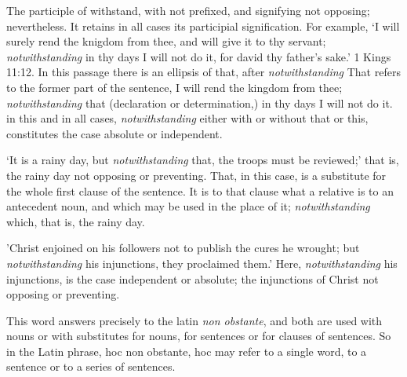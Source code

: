 			\begin{compactitem}
				\item The participle of withstand, with not prefixed, and signifying not opposing; nevertheless. It retains in all cases its participial signification. For example, `I will surely rend the knigdom from thee, and will give it to thy servant; \textit{notwithstanding} in thy days I will not do it, for david thy father's sake.' 1 Kings 11:12. In this passage there is an ellipsis of that, after \textit{notwithstanding} That refers to the former part of the sentence, I will rend the kingdom from thee; \textit{notwithstanding} that (declaration or determination,) in thy days I will not do it. in this and in all cases, \textit{notwithstanding} either with or without that or this, constitutes the case absolute or independent.
				\item `It is a rainy day, but \textit{notwithstanding} that, the troops must be reviewed;' that is, the rainy day not opposing or preventing. That, in this case, is a substitute for the whole first clause of the sentence. It is to that clause what a relative is to an antecedent noun, and which may be used in the place of it; \textit{notwithstanding} which, that is, the rainy day.
				\item 'Christ enjoined on his followers not to publish the cures he wrought; but \textit{notwithstanding} his injunctions, they proclaimed them.' Here, \textit{notwithstanding} his injunctions, is the case independent or absolute; the injunctions of Christ not opposing or preventing.
				\item This word answers precisely to the latin \textit{non obstante}, and both are used with nouns or with substitutes for nouns, for sentences or for clauses of sentences. So in the Latin phrase, hoc non obstante, hoc may refer to a single word, to a sentence or to a series of sentences.
			\end{compactitem}



